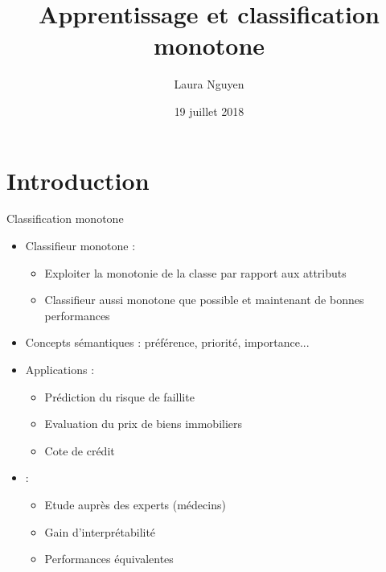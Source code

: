 \documentclass[usenames,dvipsnames]{beamer}
\title[Classification monotone]{Apprentissage et classification monotone}
\author{Laura Nguyen}
\institute{LFI}
\date{19 juillet 2018}
\begin{document}
\begin{frame}
  \titlepage
\end{frame}


\section{Introduction}

\begin{frame}{Classification monotone}
\begin{itemize}
\item Classifieur monotone :
    \begin{itemize}
        \item Exploiter la monotonie de la classe par rapport aux attributs
        \item Classifieur aussi monotone que possible et maintenant de bonnes performances
    \end{itemize}
\item Concepts sémantiques : préférence, priorité, importance...
\item Applications : 
    \begin{itemize}
        \item Prédiction du risque de faillite
        \item Evaluation du prix de biens immobiliers
        \item Cote de crédit 
    \end{itemize}
\item \textcite{pazzani-acceptance} :
    \begin{itemize}
        \item Etude auprès des experts (médecins)
        \item Gain d'interprétabilité
        \item Performances équivalentes 
    \end{itemize}
\end{itemize}
\end{frame}
\end{document}
